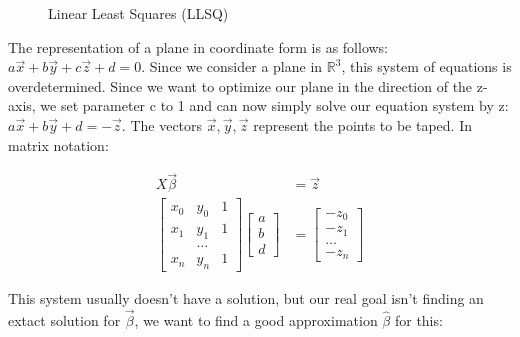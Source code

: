 \documentclass[11pt,oneside,openright]{mpreport}
\begin{document}
\begin{figure}[!ht]
\caption{Linear Least Squares (LLSQ)}

\label{LLSQ_MIN}
\end{figure}


The representation of a plane in coordinate form is as follows: $ a\vec{x} + b\vec{y} + c\vec{z} + d = 0 $. Since we consider a plane in $\mathbb{R}^3$, this system of equations is overdetermined.
Since we want to optimize our plane in the direction of the z-axis, we set parameter c to 1 and can now simply solve our equation system by z: $a\vec{x} + b\vec{y} + d = -\vec{z}$.
The vectors $\vec{x},\vec{y},\vec{z}$ represent the points to be taped.
In matrix notation:

\begin{align*}
X \vec{\beta} &= \vec{z}\\
\begin{bmatrix}
x_0 & y_0 & 1 \\
x_1 & y_1 & 1 \\
 & \dots & \\
x_n & y_n & 1 
\end{bmatrix} 
\begin{bmatrix}
a \\
b \\
d 
\end{bmatrix}
&= 
\begin{bmatrix}
-z_0 \\
-z_1 \\
\dots \\
-z_n 
\end{bmatrix} 
\end{align*}

This system usually doesn't have a solution, but our real goal isn't finding an extact solution for $\vec\beta$, we want to find a good approximation $\hat{\beta}$ for this:
\end{document}
